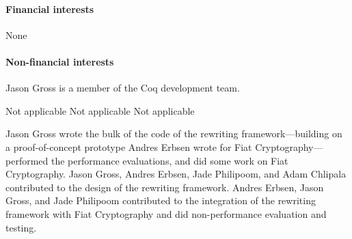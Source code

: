 \documentclass[sn-mathphys,pdflatex]{sn-jnl}%
\makeatletter
\renewcommand{\todo}[2][]{\tikzexternaldisable\@todo[#1]{#2}\tikzexternalenable}
\theoremstyle{thmstyleone}%
\theoremstyle{thmstyletwo}%
\theoremstyle{thmstylethree}%
\makeatother
\begin{document}
\fundingtext

%



\paragraph*{Financial interests}
None

\paragraph*{Non-financial interests}
Jason Gross is a member of the Coq development team.

Not applicable
Not applicable
Not applicable

Jason Gross wrote the bulk of the code of the rewriting framework---building on a proof-of-concept prototype Andres Erbsen wrote for Fiat Cryptography---performed the performance evaluations, and did some work on Fiat Cryptography.
Jason Gross, Andres Erbsen, Jade Philipoom, and Adam Chlipala contributed to the design of the rewriting framework.
Andres Erbsen, Jason Gross, and Jade Philipoom contributed to the integration of the rewriting framework with Fiat Cryptography and did non-performance evaluation and testing.
\end{document}
